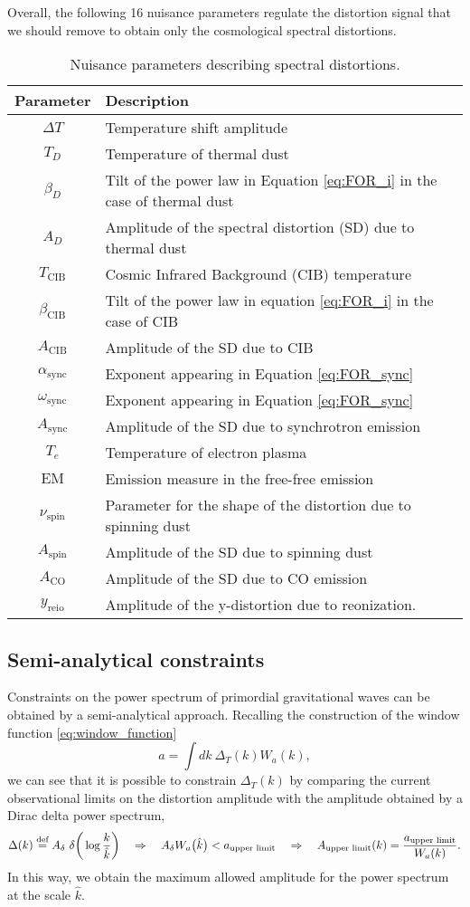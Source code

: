 Overall, the following 16 nuisance parameters regulate the distortion signal that we should remove to obtain only the cosmological spectral distortions.
\begin{table}[h!]
\centering
\begin{tabular}{ c p{12cm} }
\hline
\textbf{Parameter} & \textbf{Description} \\
\hline
$\Delta T$      & Temperature shift amplitude \\
$T_D$           & Temperature of thermal dust \\
$\beta_D$       & Tilt of the power law in Equation \eqref{eq:FOR_i} in the case of thermal dust\\
$A_D$           & Amplitude of the spectral distortion (SD) due to thermal dust \\
$T_{\text{CIB}}$& Cosmic Infrared Background (CIB) temperature \\
$\beta_{\text{CIB}}$ & Tilt of the power law in equation \eqref{eq:FOR_i} in the case of CIB \\
$A_{\text{CIB}}$ & Amplitude of the SD due to CIB \\
$\alpha_{\text{sync}}$ & Exponent appearing in Equation \eqref{eq:FOR_sync} \\
$\omega_{\text{sync}}$ & Exponent appearing in Equation \eqref{eq:FOR_sync} \\
$A_{\text{sync}}$ & Amplitude of the SD due to synchrotron emission \\
$T_e$           & Temperature of electron plasma \\
$\mathrm{EM}$   & Emission measure in the free-free emission \\
$\nu_{\text{spin}}$ & Parameter for the shape of the distortion due to spinning dust \\
$A_{\text{spin}}$ & Amplitude of the SD due to spinning dust \\
$A_{\text{CO}}$ & Amplitude of the SD due to CO emission \\
$y_\text{reio}$ & Amplitude of the y-distortion due to reonization.\\
\hline
\end{tabular}
\caption{Nuisance parameters describing spectral distortions.}
\label{tab:nui_pixie}
\end{table}
\subsection{Semi-analytical constraints}
Constraints on the power spectrum of primordial gravitational waves can be obtained by a semi-analytical approach. Recalling the construction of the window function \eqref{eq:window_function}
$$a=\int dk\ \Delta_T(k) W_a(k),$$
we can see that it is possible to constrain $ \Delta_T(k)$ by comparing the current observational limits on the distortion amplitude with the amplitude obtained by a Dirac delta power spectrum,
$$\Delta(k)\defeq A_\delta\ \delta\bigg(\log\frac{k}{\hat k}\bigg)\quad \Rightarrow\quad A_\delta W_a\big(\hat k\big)<a_{\text{upper limit}}\quad \Rightarrow\quad A_{\text{upper limit}}(k)=\frac{a_{\text{upper limit}}}{W_a(k)}.$$
In this way, we obtain the maximum allowed amplitude for the power spectrum at the scale $\hat k$.

